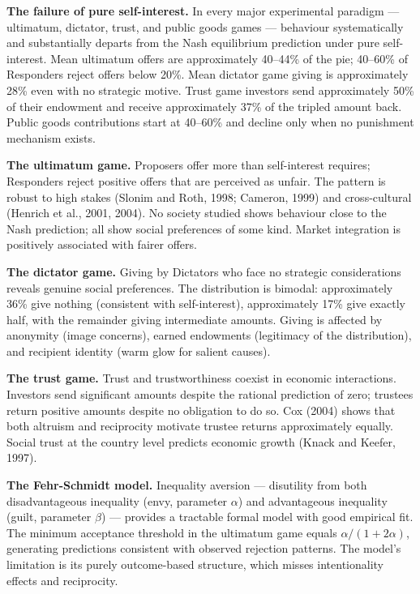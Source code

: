 \documentclass[12pt, letterpaper]{article}
\begin{document}
\textbf{The failure of pure self-interest.} In every major experimental paradigm --- ultimatum, dictator, trust, and public goods games --- behaviour systematically and substantially departs from the Nash equilibrium prediction under pure self-interest. Mean ultimatum offers are approximately 40--44\% of the pie; 40--60\% of Responders reject offers below 20\%. Mean dictator game giving is approximately 28\% even with no strategic motive. Trust game investors send approximately 50\% of their endowment and receive approximately 37\% of the tripled amount back. Public goods contributions start at 40--60\% and decline only when no punishment mechanism exists.

\textbf{The ultimatum game.} Proposers offer more than self-interest requires; Responders reject positive offers that are perceived as unfair. The pattern is robust to high stakes (Slonim and Roth, 1998; Cameron, 1999) and cross-cultural (Henrich et al., 2001, 2004). No society studied shows behaviour close to the Nash prediction; all show social preferences of some kind. Market integration is positively associated with fairer offers.

\textbf{The dictator game.} Giving by Dictators who face no strategic considerations reveals genuine social preferences. The distribution is bimodal: approximately 36\% give nothing (consistent with self-interest), approximately 17\% give exactly half, with the remainder giving intermediate amounts. Giving is affected by anonymity (image concerns), earned endowments (legitimacy of the distribution), and recipient identity (warm glow for salient causes).

\textbf{The trust game.} Trust and trustworthiness coexist in economic interactions. Investors send significant amounts despite the rational prediction of zero; trustees return positive amounts despite no obligation to do so. Cox (2004) shows that both altruism and reciprocity motivate trustee returns approximately equally. Social trust at the country level predicts economic growth (Knack and Keefer, 1997).

\textbf{The Fehr-Schmidt model.} Inequality aversion --- disutility from both disadvantageous inequality (envy, parameter $\alpha$) and advantageous inequality (guilt, parameter $\beta$) --- provides a tractable formal model with good empirical fit. The minimum acceptance threshold in the ultimatum game equals $\alpha/(1+2\alpha)$, generating predictions consistent with observed rejection patterns. The model's limitation is its purely outcome-based structure, which misses intentionality effects and reciprocity.
\end{document}

